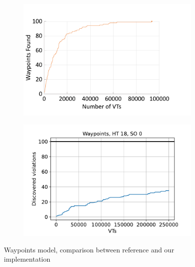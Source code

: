 \documentclass[
fancyheadings, %
%
%
]{stsreprt}
\begin{document}
\begin{figure}
    \begin{subfigure}[b]{.5\textwidth}
        \centering
        \includegraphics[width=\textwidth]{../evaluation/assets/EXP-00-grapple-paper-waypoints.pdf}
        \label{fig:evaluation:EXP-00:1}
    \end{subfigure}
    \begin{subfigure}[b]{.5\textwidth}
        \centering
        \includegraphics[width=\textwidth]{../evaluation/output-assets/EXP-00-comparison-with-paper.pdf}
        \label{fig:evaluation:EXP-00:2}
    \end{subfigure}
    \caption{Waypoints model, comparison between reference and our implementation}
    \label{fig:evaluation:EXP-00}
\end{figure}
\end{document}
